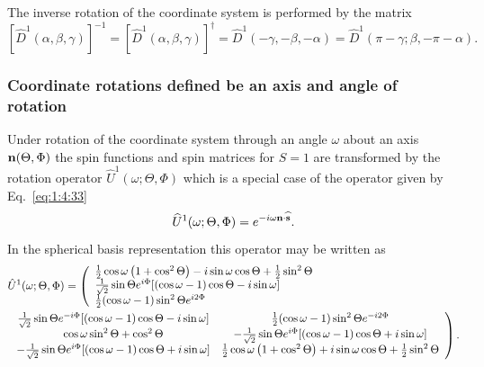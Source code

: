 The inverse rotation of the coordinate system is performed by the matrix
\begin{equation}
\left[\widehat{D}^{1}(\alpha, \beta, \gamma)\right]^{-1}=\left[\widehat{D}^{1}(\alpha, \beta, \gamma)\right]^{\dagger}=\widehat{D}^{1}(-\gamma,-\beta,-\alpha)=\widehat{D}^{1}(\pi-\gamma ; \beta,-\pi-\alpha) . \label{eq:2:6:78}
\end{equation}
\subsubsection{Coordinate rotations defined be an axis and angle of rotation}
Under rotation of the coordinate system through an angle $\omega$ about an axis $\mathbf{n}(\Theta, \Phi)$ the spin functions and spin matrices for $S=1$ are transformed by the rotation operator $\hat{U}^{1}(\omega ; \Theta, \Phi)$ which is a special case of the operator given by Eq.~\eqref{eq:1:4:33}
\begin{equation}
\widehat{U}^{1}(\omega ; \Theta, \Phi)=e^{-i \omega \mathbf{n} \cdot \widehat{\mathbf{s}}} . \label{eq:2:6:79}
\end{equation}
In the spherical basis representation this operator may be written as
\begin{align}
& \hat{U}^{1}(\omega ; \Theta, \Phi)=\left(\begin{array}{l}
\frac{1}{2} \cos \omega\left(1+\cos ^{2} \Theta\right)-i \sin \omega \cos \Theta+\frac{1}{2} \sin ^{2} \Theta \\
\frac{1}{\sqrt{2}} \sin \Theta e^{i \Phi}[(\cos \omega-1) \cos \Theta-i \sin \omega] \\
\frac{1}{2}(\cos \omega-1) \sin ^{2} \Theta e^{i 2 \Phi}
\end{array}\right. \notag\\
& \left.\begin{array}{cc}
\frac{1}{\sqrt{2}} \sin \Theta e^{-i \Phi}[(\cos \omega-1) \cos \Theta-i \sin \omega] &
\frac{1}{2}(\cos \omega-1) \sin ^{2} \Theta e^{-i 2 \Phi} \\
\cos \omega \sin ^{2} \Theta+\cos ^{2} \Theta &
-\frac{1}{\sqrt{2}} \sin \Theta e^{i \Phi}[(\cos \omega-1) \cos \Theta+i \sin \omega] \\
-\frac{1}{\sqrt{2}} \sin \Theta e^{i \Phi}[(\cos \omega-1) \cos \Theta+i \sin \omega] & \frac{1}{2} \cos \omega\left(1+\cos ^{2} \Theta\right)+i \sin \omega \cos \Theta+\frac{1}{2} \sin ^{2} \Theta
\end{array}\right) . \label{eq:2:6:80}
\end{align}
